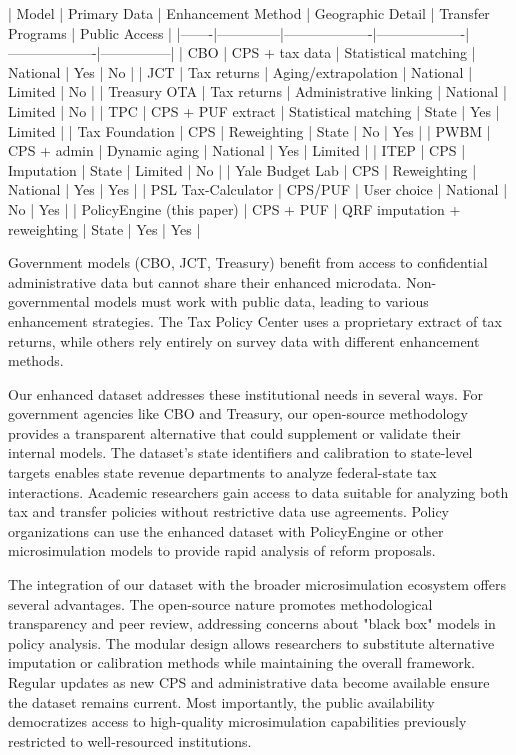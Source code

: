 | Model | Primary Data | Enhancement Method | Geographic Detail | Transfer Programs | Public Access |
|-------|--------------|-------------------|-------------------|-------------------|---------------|
| CBO | CPS + tax data | Statistical matching | National | Yes | No |
| JCT | Tax returns | Aging/extrapolation | National | Limited | No |
| Treasury OTA | Tax returns | Administrative linking | National | Limited | No |
| TPC | CPS + PUF extract | Statistical matching | State | Yes | Limited |
| Tax Foundation | CPS | Reweighting | State | No | Yes |
| PWBM | CPS + admin | Dynamic aging | National | Yes | Limited |
| ITEP | CPS | Imputation | State | Limited | No |
| Yale Budget Lab | CPS | Reweighting | National | Yes | Yes |
| PSL Tax-Calculator | CPS/PUF | User choice | National | No | Yes |
| PolicyEngine (this paper) | CPS + PUF | QRF imputation + reweighting | State | Yes | Yes |

Government models (CBO, JCT, Treasury) benefit from access to confidential administrative data but cannot share their enhanced microdata. Non-governmental models must work with public data, leading to various enhancement strategies. The Tax Policy Center uses a proprietary extract of tax returns, while others rely entirely on survey data with different enhancement methods.

Our enhanced dataset addresses these institutional needs in several ways. For government agencies like CBO and Treasury, our open-source methodology provides a transparent alternative that could supplement or validate their internal models. The dataset's state identifiers and calibration to state-level targets enables state revenue departments to analyze federal-state tax interactions. Academic researchers gain access to data suitable for analyzing both tax and transfer policies without restrictive data use agreements. Policy organizations can use the enhanced dataset with PolicyEngine or other microsimulation models to provide rapid analysis of reform proposals.

The integration of our dataset with the broader microsimulation ecosystem offers several advantages. The open-source nature promotes methodological transparency and peer review, addressing concerns about "black box" models in policy analysis. The modular design allows researchers to substitute alternative imputation or calibration methods while maintaining the overall framework. Regular updates as new CPS and administrative data become available ensure the dataset remains current. Most importantly, the public availability democratizes access to high-quality microsimulation capabilities previously restricted to well-resourced institutions.
